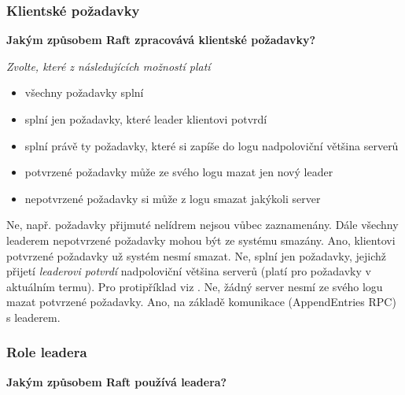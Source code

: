 \documentclass[usenames,dvipsnames,9pt]{beamer}
\begin{document}
{
\begin{frame}[fragile]
\frametitle{Klientské požadavky}

\begin{center}
{\bf Jakým způsobem Raft zpracovává klientské požadavky?}
\end{center}

\vspace{1em}

{\em Zvolte, které z následujících možností platí}

\begin{itemize}
\item všechny požadavky splní 
\item splní jen požadavky, které leader klientovi potvrdí 
\item splní právě ty požadavky, které si zapíše do logu nadpoloviční většina serverů 
\item potvrzené požadavky může ze svého logu mazat jen nový leader 
\item nepotvrzené požadavky si může z logu smazat jakýkoli server 
\end{itemize}
\vspace{1em}
\begin{overprint}[\textwidth]
   Ne, např. požadavky přijmuté nelídrem nejsou vůbec zaznamenány. Dále všechny leaderem nepotvrzené požadavky mohou být ze systému smazány.
   Ano, klientovi potvrzené požadavky už systém nesmí smazat.
   Ne, splní jen požadavky, jejichž přijetí \emph{leaderovi potvrdí} nadpoloviční většina serverů (platí pro požadavky v aktuálním termu). Pro protipříklad viz \href{https://www.cs.princeton.edu/courses/archive/fall16/cos418/papers/raft.pdf}{}.
   Ne, žádný server nesmí ze svého logu mazat potvrzené požadavky.
   Ano, na základě komunikace (AppendEntries RPC) s leaderem.
\end{overprint}
\end{frame}


\begin{frame}[fragile]
\frametitle{Role leadera}

\begin{center}
{\bf Jakým způsobem Raft používá leadera?}
\end{center}


\end{frame}}
\end{document}

